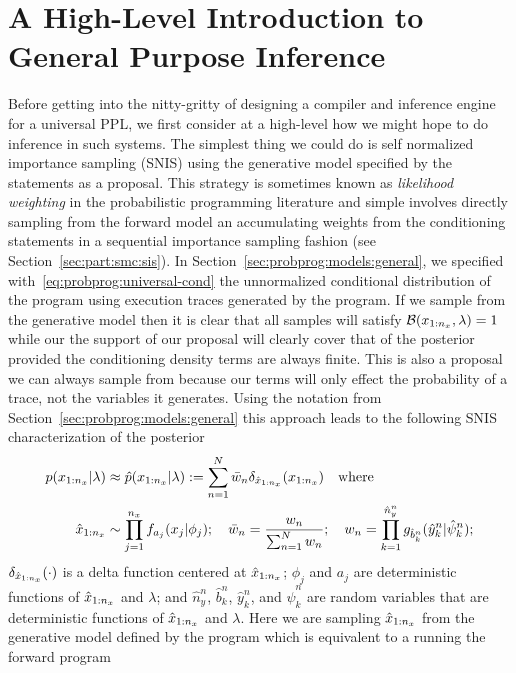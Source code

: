 
\section{A High-Level Introduction to General Purpose Inference}
\label{sec:proginf:high}

Before getting into the nitty-gritty of designing a compiler and inference engine for a universal PPL, we
first consider at a high-level how we might hope to do inference in such systems.  The simplest
thing we could do is self normalized importance sampling (SNIS) using the generative model specified by the \sample
statements as a proposal.  This strategy is sometimes known as \emph{likelihood weighting} in the probabilistic
programming literature and simple involves directly sampling from the forward model an accumulating
weights from the \observe conditioning statements in a sequential importance sampling fashion (see 
Section~\ref{sec:part:smc:sis}).
In Section~\ref{sec:probprog:models:general}, we specified with~\eqref{eq:probprog:universal-cond}
the unnormalized conditional distribution of the program using execution traces generated
by the program.  If we sample from the generative model then it is clear that all samples will satisfy
$\mathcal{B}(x_{1:n_x},\lambda)=1$ while our the support of our proposal will clearly cover that of
the posterior provided the conditioning density terms are always finite.  This is also a proposal
we can always sample from because our \observe terms will only effect the probability of a trace, not
the variables it generates.  Using the notation from Section~\ref{sec:probprog:models:general} 
this approach leads to the following SNIS characterization of the posterior
\begin{align}
p(x_{1:n_x} | \lambda) &\approx \hat{p}(x_{1:n_x} | \lambda) := \sum_{n=1}^{N} \bar w_n \delta_{\hat{x}_{1:n_x}} (x_{1:n_x})
\quad \text{where}  \\
\hat{x}_{1:n_x} &\sim \prod_{j=1}^{n_x} f_{a_j}(x_j | \phi_j); \quad \bar w_n = \frac{w_n}{\sum_{n=1}^{N} w_n}; \quad
w_n = \prod_{k=1}^{\hat{n}_{y}^n} g_{\hat{b}_{k}^n}(\hat{y}_{k}^n | \hat{\psi}_{k}^n);
\end{align}
$\delta_{\hat{x}_{1:n_x}} (\cdot)$ is a delta function centered at $\hat{x}_{1:n_x}$; $\phi_j$ and $a_j$ are deterministic functions of $\hat{x}_{1:n_x}$ 
and $\lambda$; and $\hat{n}_{y}^n$, $\hat{b}_{k}^n$, $\hat{y}_{k}^n$, and $\hat{\psi}_{k}^n$ are random variables
that are deterministic functions of $\hat{x}_{1:n_x}$ and $\lambda$.  Here we are sampling $\hat{x}_{1:n_x}$ from
the generative model defined by the program which is equivalent to a running the forward program
